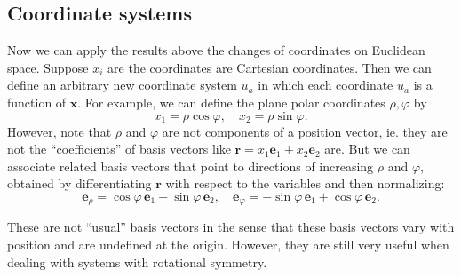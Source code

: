 \documentclass[a4paper]{article}
\begin{document}
\subsection{Coordinate systems}
Now we can apply the results above the changes of coordinates on Euclidean space. Suppose $x_i$ are the coordinates are Cartesian coordinates. Then we can define an arbitrary new coordinate system $u_a$ in which each coordinate $u_a$ is a function of $\mathbf{x}$. For example, we can define the plane polar coordinates $\rho, \varphi$ by
\[
  x_1 = \rho\cos\varphi, \quad x_2 = \rho\sin \varphi.
\]
However, note that $\rho$ and $\varphi$ are not components of a position vector, ie. they are not the ``coefficients'' of basis vectors like $\mathbf{r} = x_1\mathbf{e}_1 + x_2\mathbf{e}_2$ are. But we can associate related basis vectors that point to directions of increasing $\rho$ and $\varphi$, obtained by differentiating $\mathbf{r}$ with respect to the variables and then normalizing:
\[
  \mathbf{e}_\rho = \cos \varphi\, \mathbf{e}_1 + \sin \varphi\, \mathbf{e}_2,\quad \mathbf{e}_\varphi = -\sin \varphi\, \mathbf{e}_1 + \cos \varphi\, \mathbf{e}_2.
\]
\begin{center}
\end{center}
These are not ``usual'' basis vectors in the sense that these basis vectors vary with position and are undefined at the origin. However, they are still very useful when dealing with systems with rotational symmetry.
\end{document}
